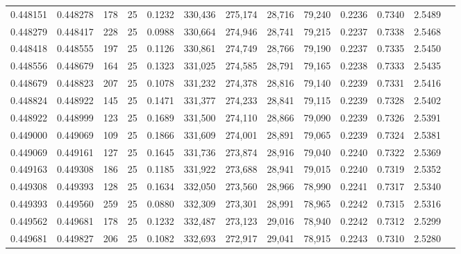 \begin{tabular}{rrrrrrrrrrrrr}
0.448151 & 0.448278 &   178 &  25 &                                     0.1232 & 330,436 & 275,174 &  28,716 &  79,240 & 0.2236 & 0.7340 & 2.5489 \\
0.448279 & 0.448417 &   228 &  25 &                                     0.0988 & 330,664 & 274,946 &  28,741 &  79,215 & 0.2237 & 0.7338 & 2.5468 \\
0.448418 & 0.448555 &   197 &  25 &                                     0.1126 & 330,861 & 274,749 &  28,766 &  79,190 & 0.2237 & 0.7335 & 2.5450 \\
0.448556 & 0.448679 &   164 &  25 &                                     0.1323 & 331,025 & 274,585 &  28,791 &  79,165 & 0.2238 & 0.7333 & 2.5435 \\
0.448679 & 0.448823 &   207 &  25 &                                     0.1078 & 331,232 & 274,378 &  28,816 &  79,140 & 0.2239 & 0.7331 & 2.5416 \\
0.448824 & 0.448922 &   145 &  25 &                                     0.1471 & 331,377 & 274,233 &  28,841 &  79,115 & 0.2239 & 0.7328 & 2.5402 \\
0.448922 & 0.448999 &   123 &  25 &                                     0.1689 & 331,500 & 274,110 &  28,866 &  79,090 & 0.2239 & 0.7326 & 2.5391 \\
0.449000 & 0.449069 &   109 &  25 &                                     0.1866 & 331,609 & 274,001 &  28,891 &  79,065 & 0.2239 & 0.7324 & 2.5381 \\
0.449069 & 0.449161 &   127 &  25 &                                     0.1645 & 331,736 & 273,874 &  28,916 &  79,040 & 0.2240 & 0.7322 & 2.5369 \\
0.449163 & 0.449308 &   186 &  25 &                                     0.1185 & 331,922 & 273,688 &  28,941 &  79,015 & 0.2240 & 0.7319 & 2.5352 \\
0.449308 & 0.449393 &   128 &  25 &                                     0.1634 & 332,050 & 273,560 &  28,966 &  78,990 & 0.2241 & 0.7317 & 2.5340 \\
0.449393 & 0.449560 &   259 &  25 &                                     0.0880 & 332,309 & 273,301 &  28,991 &  78,965 & 0.2242 & 0.7315 & 2.5316 \\
0.449562 & 0.449681 &   178 &  25 &                                     0.1232 & 332,487 & 273,123 &  29,016 &  78,940 & 0.2242 & 0.7312 & 2.5299 \\
0.449681 & 0.449827 &   206 &  25 &                                     0.1082 & 332,693 & 272,917 &  29,041 &  78,915 & 0.2243 & 0.7310 & 2.5280 \\

\end{tabular}
